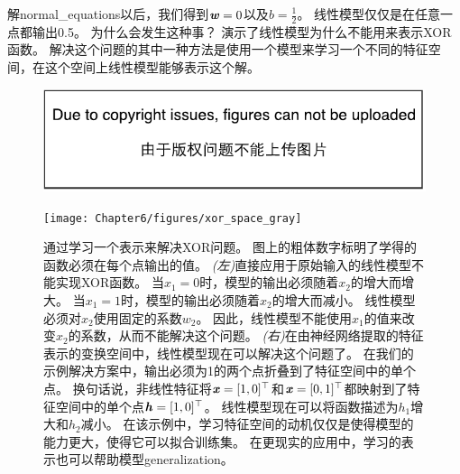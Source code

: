 解\gls{normal_equations}以后，我们得到$\boldsymbol{\mathit{w}} = 0$以及$b = \frac{1}{2}$。
线性模型仅仅是在任意一点都输出0.5。
为什么会发生这种事？
演示了线性模型为什么不能用来表示XOR函数。
解决这个问题的其中一种方法是使用一个模型来学习一个不同的特征空间，在这个空间上线性模型能够表示这个解。
\begin{figure}[!htb]
\ifOpenSource
\centerline{\includegraphics{figure.pdf}}
\else
\centerline{\texttt{[image: Chapter6/figures/xor\_space\_gray]}}
\fi
\captionsetup{singlelinecheck=off}
\caption{通过学习一个表示来解决XOR问题。
图上的粗体数字标明了学得的函数必须在每个点输出的值。
\emph{(左)}直接应用于原始输入的线性模型不能实现XOR函数。
当$x_1 = 0$时，模型的输出必须随着$x_2$的增大而增大。
当$x_1 = 1$时，模型的输出必须随着$x_2$的增大而减小。
线性模型必须对$x_2$使用固定的系数$w_2$。
因此，线性模型不能使用$x_1$的值来改变$x_2$的系数，从而不能解决这个问题。 
\emph{(右)}在由神经网络提取的特征表示的变换空间中，线性模型现在可以解决这个问题了。
在我们的示例解决方案中，输出必须为1的两个点折叠到了特征空间中的单个点。
换句话说，非线性特征将$\boldsymbol{\mathit{x}} = [1, 0]^\top$和$\boldsymbol{\mathit{x}} = [0, 1]^\top$都映射到了特征空间中的单个点$\boldsymbol{\mathit{h}} = [1, 0]^\top$。
线性模型现在可以将函数描述为$h_1$增大和$h_2$减小。
在该示例中，学习特征空间的动机仅仅是使得模型的能力更大，使得它可以拟合训练集。
在更现实的应用中，学习的表示也可以帮助模型\gls{generalization}。}
\label{fig:chap6_xor_space_gray}
\end{figure}


